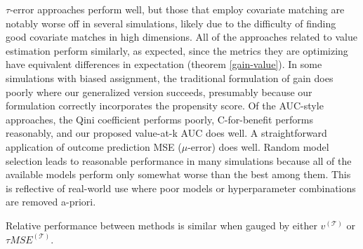 $\tau$-error approaches perform well, but those that employ covariate matching are notably worse off in several simulations, likely due to the difficulty of finding good covariate matches in high dimensions. All of the approaches related to value estimation perform similarly, as expected, since the metrics they are optimizing have equivalent differences in expectation (theorem \ref{gain-value}). In some simulations with biased assignment, the traditional formulation of gain does poorly where our generalized version succeeds, presumably because our formulation correctly incorporates the propensity score. Of the AUC-style approaches, the Qini coefficient performs poorly, C-for-benefit performs reasonably, and our proposed value-at-k AUC does well. A straightforward application of outcome prediction MSE ($\mu$-error) does well. Random model selection leads to reasonable performance in many simulations because all of the available models perform only somewhat worse than the best among them. This is reflective of real-world use where poor models or hyperparameter combinations are removed a-priori. 

Relative performance between methods is similar when gauged by either $v^{(\mathcal T)}$ or $\tau MSE^{(\mathcal T)}$. 

